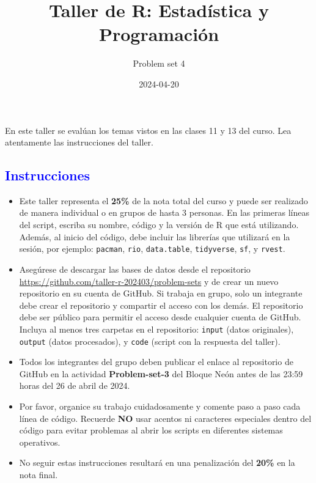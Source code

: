 \documentclass[
]{article}
\title{Taller de R: Estadística y Programación}
\author{Problem set 4}
\date{2024-04-20}
\begin{document}
\maketitle

En este taller se evalúan los temas vistos en las clases 11 y 13 del
curso. Lea atentamente las instrucciones del taller.

\begin{center} \textcolor{blue}{\subsection{Instrucciones}} \end{center}

\begin{itemize}
\item
  Este taller representa el \textbf{25\%} de la nota total del curso y
  puede ser realizado de manera individual o en grupos de hasta 3
  personas. En las primeras líneas del script, escriba su nombre, código
  y la versión de R que está utilizando. Además, al inicio del código,
  debe incluir las librerías que utilizará en la sesión, por ejemplo:
  \texttt{pacman}, \texttt{rio}, \texttt{data.table},
  \texttt{tidyverse}, \texttt{sf}, y \texttt{rvest}.
\item
  Asegúrese de descargar las bases de datos desde el repositorio
  \url{https://github.com/taller-r-202403/problem-sets} y de crear un
  nuevo repositorio en su cuenta de GitHub. Si trabaja en grupo, solo un
  integrante debe crear el repositorio y compartir el acceso con los
  demás. El repositorio debe ser público para permitir el acceso desde
  cualquier cuenta de GitHub. Incluya al menos tres carpetas en el
  repositorio: \texttt{input} (datos originales), \texttt{output} (datos
  procesados), y \texttt{code} (script con la respuesta del taller).
\item
  Todos los integrantes del grupo deben publicar el enlace al
  repositorio de GitHub en la actividad \textbf{Problem-set-3} del
  Bloque Neón antes de las 23:59 horas del 26 de abril de 2024.
\item
  Por favor, organice su trabajo cuidadosamente y comente paso a paso
  cada línea de código. Recuerde \textbf{NO} usar acentos ni caracteres
  especiales dentro del código para evitar problemas al abrir los
  scripts en diferentes sistemas operativos.
\item
  No seguir estas instrucciones resultará en una penalización del
  \textbf{20\%} en la nota final.
\end{itemize}
\end{document}
